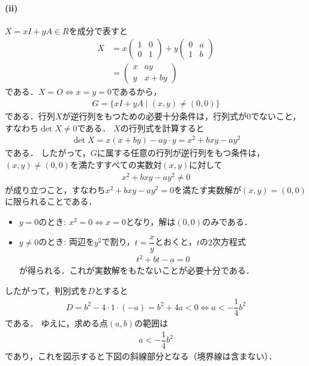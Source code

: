 \documentclass[../../main.tex]{subfiles}
\begin{document}
\paragraph{(ii)}
$X = xI + yA \in R$を成分で表すと
\begin{align}
  X &= x
  \begin{pmatrix} 1 & 0 \\ 0 & 1
  \end{pmatrix} + y
  \begin{pmatrix} 0 & a \\ 1 & b
  \end{pmatrix} \nonumber\\
  &=
  \begin{pmatrix} x & ay \\ y & x + by
  \end{pmatrix}
\end{align}
である．$X = O \Longleftrightarrow x = y = 0$であるから，
\begin{align}
  G = \{ xI + yA \mid (x, y) \neq (0, 0) \}
\end{align}
である．行列$X$が逆行列をもつための必要十分条件は，行列式が$0$でないこと，すなわち$\det X \neq 0$である．
$X$の行列式を計算すると
\begin{align}
  \det X = x(x + by) - ay \cdot y = x^2 + bxy - ay^2
\end{align}
である．
したがって，$G$に属する任意の行列が逆行列をもつ条件は，$(x, y) \neq (0, 0)$を満たすすべての実数対$(x, y)$に対して
\begin{align}
  x^2 + bxy - ay^2 \neq 0
\end{align}
が成り立つこと，すなわち$x^2 + bxy - ay^2 = 0$を満たす実数解が$(x, y) = (0, 0)$に限られることである．
\begin{itemize}
  \item $y = 0$のとき: $x^2 = 0 \Longleftrightarrow x = 0$となり，解は$(0, 0)$のみである．
  \item $y \neq 0$のとき: 両辺を$y^2$で割り，$t = \dfrac{x}{y}$とおくと，$t$の$2$次方程式
    \begin{align}
      t^2 + bt - a = 0
    \end{align}
    が得られる．これが実数解をもたないことが必要十分である．
\end{itemize}
したがって，判別式を$D$とすると
\begin{align}
  D = b^2 - 4 \cdot 1 \cdot (-a) = b^2 + 4a < 0 \Longleftrightarrow a < -\dfrac{1}{4}b^2
\end{align}
である．
ゆえに，求める点$(a, b)$の範囲は
\begin{align}
  a < -\dfrac{1}{4}b^2 \tag{答}
\end{align}
であり，これを図示すると下図の斜線部分となる（境界線は含まない）．
\end{document}

